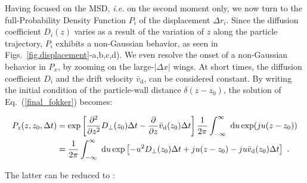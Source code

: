 Having focused on the \gls{MSD}, \textit{i.e.} on the second moment only, we now turn to the full-Probability Density Function $P_i$ of the displacement $\Delta r_i$. Since the diffusion coefficient $D_i(z)$ varies as a result of the variation of $z$ along the particle trajectory, $P_i$ exhibits a non-Gaussian behavior, as seen in Figs.~\ref{fig.displacement}-a,b,c,d). We even resolve the onset of a non-Gaussian behavior in $P_x$, by zooming on the large-$\lvert\Delta x\rvert$ wings. At short times, the diffusion coefficient $D_i$ and the drift velocity $\bar{v}_\mathrm{d}$, can be considered constant. By writing the initial condition of the particle-wall distance $\delta(z - z_0)$, the solution of Eq.~(\ref{final_fokker}) becomes:

\begin{equation}
	\begin{aligned}
		P_z(z, z_0, \Delta t) &= \exp \left[  \frac{\partial ^2}{\partial z ^2} D_\bot(z_0) \Delta t - \frac{\partial}{\partial z} \bar{v} _\mathrm{d} (z_0) \Delta t \right] \frac{1}{2 \pi} \int _{-\infty} ^{\infty} ~ \textnormal{d}u \exp (ju(z-z_0))  \\
		& = \frac{1}{2\pi} \int_{-\infty}^{\infty} ~ \textnormal{d}u \exp \left[ -u^2 D_\bot(z_0)\Delta t + ju(z-z_0) - ju  \bar{v} _\mathrm{d} (z_0) \Delta t \right] ~.
	\end{aligned}
\end{equation}

The latter can be reduced to \cite{matse_state-dependent_nodate, risken_fokker-planck_2012}:

